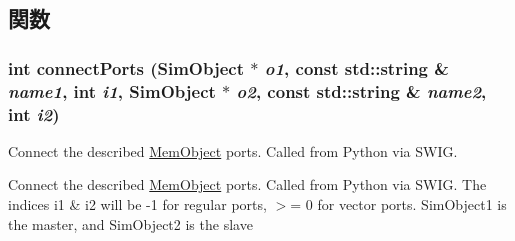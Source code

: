 \subsection{関数}
\hypertarget{pyobject_8hh_a07ed93a9ca4128b7d2b30ee7a82bb77e}{
\subsubsection[{connectPorts}]{\setlength{\rightskip}{0pt plus 5cm}int connectPorts ({\bf SimObject} $\ast$ {\em o1}, \/  const std::string \& {\em name1}, \/  int {\em i1}, \/  {\bf SimObject} $\ast$ {\em o2}, \/  const std::string \& {\em name2}, \/  int {\em i2})}}
\label{pyobject_8hh_a07ed93a9ca4128b7d2b30ee7a82bb77e}
Connect the described \hyperlink{classMemObject}{MemObject} ports. Called from Python via SWIG.

Connect the described \hyperlink{classMemObject}{MemObject} ports. Called from Python via SWIG. The indices i1 \& i2 will be -\/1 for regular ports, $>$= 0 for vector ports. SimObject1 is the master, and SimObject2 is the slave 


